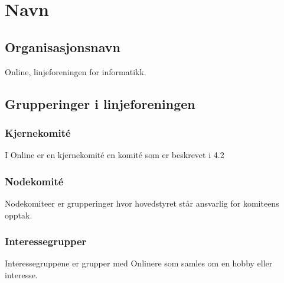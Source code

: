 \chapter{Navn}
\section{Organisasjonsnavn}
\vspace{23pt}
Online, linjeforeningen for informatikk.




\section{Grupperinger i linjeforeningen}
\vspace{23pt}

\subsection{Kjernekomité}

I Online er en kjernekomité en komité som er beskrevet i 4.2

\subsection{Nodekomité}

Nodekomiteer er grupperinger hvor hovedstyret står ansvarlig for komiteens opptak.


\subsection{Interessegrupper}

Interessegruppene er grupper med Onlinere som samles om en hobby eller interesse.

